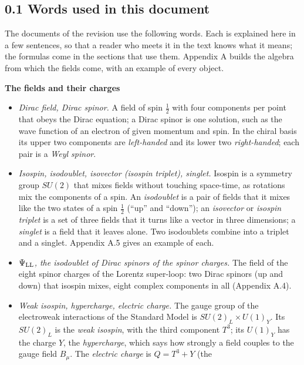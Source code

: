 \documentclass[
  10pt,
]{article}
\providecommand{\tightlist}{%
  \setlength{\itemsep}{0pt}\setlength{\parskip}{0pt}}
\begin{document}
\hypertarget{words-used-in-this-document}{%
\subsection{0.1 Words used in this
document}\label{words-used-in-this-document}}

The documents of the revision use the following words. Each is explained
here in a few sentences, so that a reader who meets it in the text knows
what it means; the formulas come in the sections that use them. Appendix
A builds the algebra from which the fields come, with an example of
every object.

\textbf{The fields and their charges}

\begin{itemize}
\tightlist
\item
  \emph{Dirac field, Dirac spinor.} A field of spin \(\tfrac12\) with
  four components per point that obeys the Dirac equation; a Dirac
  spinor is one solution, such as the wave function of an electron of
  given momentum and spin. In the chiral basis its upper two components
  are \emph{left-handed} and its lower two \emph{right-handed}; each
  pair is a \emph{Weyl spinor}.
\item
  \emph{Isospin, isodoublet, isovector (isospin triplet), singlet.}
  Isospin is a symmetry group \(SU(2)\) that mixes fields without
  touching space-time, as rotations mix the components of a spin. An
  \emph{isodoublet} is a pair of fields that it mixes like the two
  states of a spin \(\tfrac12\) (``up'' and ``down''); an
  \emph{isovector} or \emph{isospin triplet} is a set of three fields
  that it turns like a vector in three dimensions; a \emph{singlet} is a
  field that it leaves alone. Two isodoublets combine into a triplet and
  a singlet. Appendix A.5 gives an example of each.
\item
  \emph{\(\Psi_{\rm LL}\), the isodoublet of Dirac spinors of the spinor
  charges.} The field of the eight spinor charges of the Lorentz
  super-loop: two Dirac spinors (up and down) that isospin mixes, eight
  complex components in all (Appendix A.4).
\item
  \emph{Weak isospin, hypercharge, electric charge.} The gauge group of
  the electroweak interactions of the Standard Model is
  \(SU(2)_L\times U(1)_Y\). Its \(SU(2)_L\) is the \emph{weak isospin},
  with the third component \(T^3\); its \(U(1)_Y\) has the charge \(Y\),
  the \emph{hypercharge}, which says how strongly a field couples to the
  gauge field \(B_\mu\). The \emph{electric charge} is \(Q=T^3+Y\) (the

\end{itemize}
\end{document}
